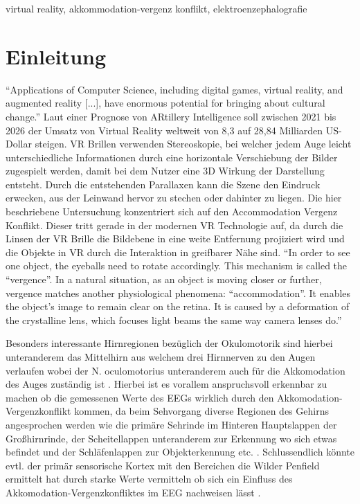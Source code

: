 \documentclass[conference]{IEEEtran}
\begin{document}
\begin{IEEEkeywords}
virtual reality, akkommodation-vergenz konflikt, elektroenzephalografie
\end{IEEEkeywords}

\section{Einleitung}
“Applications of Computer Science, including digital games, virtual reality, and augmented reality [...], have enormous potential for bringing about cultural change.” \cite{b3} Laut einer Prognose von ARtillery Intelligence soll zwischen 2021 bis 2026 der Umsatz von Virtual Reality weltweit von 8,3 auf 28,84 Milliarden US-Dollar steigen. \cite{b2} 
VR Brillen verwenden Stereoskopie, bei welcher jedem Auge leicht unterschiedliche Informationen durch eine horizontale Verschiebung der Bilder zugespielt werden, damit bei dem Nutzer eine 3D Wirkung der Darstellung entsteht. Durch die entstehenden Parallaxen kann die Szene den Eindruck erwecken, aus der Leinwand hervor zu stechen oder dahinter zu liegen.\cite{b4}
Die hier beschriebene Untersuchung konzentriert sich auf den Accommodation Vergenz Konflikt. Dieser tritt gerade in der modernen VR Technologie auf, da durch die Linsen der VR Brille die Bildebene in eine weite Entfernung projiziert wird und die Objekte in VR durch die Interaktion in greifbarer Nähe sind.
“In order to see one object, the eyeballs need to rotate accordingly. This mechanism is called the “vergence”. In a natural situation, as an object is moving closer or further, vergence matches another physiological phenomena: “accommodation”. It enables the object’s image to remain clear on the retina. It is caused by a deformation of the crystalline lens, which focuses light beams the same way camera lenses do.”\cite{b1}

Besonders interessante Hirnregionen bezüglich der Okulomotorik sind hierbei unteranderem das  Mittelhirn aus welchem drei Hirnnerven zu den Augen verlaufen wobei der N. oculomotorius unteranderem auch für die Akkomodation des Auges zuständig ist \cite{b6}. Hierbei ist es vorallem anspruchsvoll erkennbar zu machen ob die gemessenen Werte des EEGs wirklich durch den Akkomodation-Vergenzkonflikt kommen, da beim Sehvorgang diverse Regionen des Gehirns angesprochen werden wie die primäre Sehrinde im Hinteren Hauptslappen der Großhirnrinde, der Scheitellappen unteranderem zur Erkennung wo sich etwas befindet und der Schläfenlappen zur Objekterkennung etc. \cite{b8}. Schlussendlich könnte evtl. der primär sensorische Kortex mit den Bereichen die Wilder Penfield ermittelt hat durch starke Werte vermitteln ob sich ein Einfluss des Akkomodation-Vergenzkonfliktes im EEG nachweisen lässt \cite{b7}.
\end{document}
